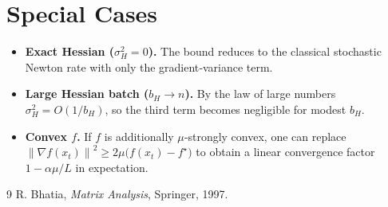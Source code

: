 \documentclass{article}
\newcommand{\norm}[1]{\left\lVert#1\right\rVert}
\newcommand{\grad}{\nabla}
\begin{document}
\section*{Special Cases}
\begin{itemize}
\item \textbf{Exact Hessian ($\sigma_H^{2}=0$).} The bound reduces to the classical stochastic Newton rate with only the gradient‑variance term.
\item \textbf{Large Hessian batch ($b_H\to n$).} By the law of large numbers $\sigma_H^{2}=O(1/b_H)$, so the third term becomes negligible for modest $b_H$.
\item \textbf{Convex $f$.} If $f$ is additionally $\mu$‑strongly convex, one can replace $\norm{\grad f(x_t)}^{2}\ge 2\mu\bigl(f(x_t)-f^{\star}\bigr)$ to obtain a linear convergence factor $1-\alpha\mu/L$ in expectation.
\end{itemize}

\begin{thebibliography}{9}
R. Bhatia, \emph{Matrix Analysis}, Springer, 1997.
\end{thebibliography}
\end{document}
